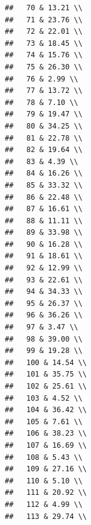 \documentclass{article}\usepackage[]{graphicx}\usepackage[]{color}
\makeatletter
\newenvironment{kframe}{%
 \def\at@end@of@kframe{}%
 \ifinner\ifhmode%
  \def\at@end@of@kframe{\end{minipage}}%
  \begin{minipage}{\columnwidth}%
 \fi\fi%
 \def\FrameCommand##1{\hskip\@totalleftmargin \hskip-\fboxsep
 \colorbox{shadecolor}{##1}\hskip-\fboxsep
     \hskip-\linewidth \hskip-\@totalleftmargin \hskip\columnwidth}%
 \MakeFramed {\advance\hsize-\width
   \@totalleftmargin\z@ \linewidth\hsize
   \@setminipage}}%
 {\par\unskip\endMakeFramed%
 \at@end@of@kframe}
\newenvironment{knitrout}{}{} %
\makeatother
\begin{document}
\begin{knitrout}
\begin{kframe}
\begin{verbatim}
##   70 & 13.21 \\ 
##   71 & 23.76 \\ 
##   72 & 22.01 \\ 
##   73 & 18.45 \\ 
##   74 & 15.76 \\ 
##   75 & 26.30 \\ 
##   76 & 2.99 \\ 
##   77 & 13.72 \\ 
##   78 & 7.10 \\ 
##   79 & 19.47 \\ 
##   80 & 34.25 \\ 
##   81 & 22.78 \\ 
##   82 & 19.64 \\ 
##   83 & 4.39 \\ 
##   84 & 16.26 \\ 
##   85 & 33.32 \\ 
##   86 & 22.48 \\ 
##   87 & 16.61 \\ 
##   88 & 11.11 \\ 
##   89 & 33.98 \\ 
##   90 & 16.28 \\ 
##   91 & 18.61 \\ 
##   92 & 12.99 \\ 
##   93 & 22.61 \\ 
##   94 & 34.33 \\ 
##   95 & 26.37 \\ 
##   96 & 36.26 \\ 
##   97 & 3.47 \\ 
##   98 & 39.00 \\ 
##   99 & 19.28 \\ 
##   100 & 14.54 \\ 
##   101 & 35.75 \\ 
##   102 & 25.61 \\ 
##   103 & 4.52 \\ 
##   104 & 36.42 \\ 
##   105 & 7.61 \\ 
##   106 & 38.23 \\ 
##   107 & 16.69 \\ 
##   108 & 5.43 \\ 
##   109 & 27.16 \\ 
##   110 & 5.10 \\ 
##   111 & 20.92 \\ 
##   112 & 4.99 \\ 
##   113 & 29.74 \\ 

\end{verbatim}
\end{kframe}
\end{knitrout}
\end{document}
